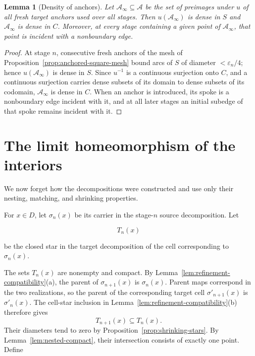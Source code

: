 \documentclass[11pt]{article}
\theoremstyle{mainplain}
\newtheorem{lemma}[theorem]{Lemma}
\theoremstyle{mainroman}
\theoremstyle{definition}
\numberwithin{equation}{section}
\begin{document}
\begin{lemma}[Density of anchors]\label{lem:anchor-density}
Let \(\mathcal A_\infty\subseteq\mathcal A\) be the set of preimages under $u$ of all
fresh target anchors used over all stages. Then \(u(\mathcal A_\infty)\) is
dense in \(S\) and \(\mathcal A_\infty\) is dense in \(C\). Moreover, at every
stage containing a given point of \(\mathcal A_\infty\), that point is incident
with a nonboundary edge.
\end{lemma}
\begin{proof}
At stage \(n\), consecutive fresh anchors of the mesh of
Proposition~\ref{prop:anchored-square-mesh} bound arcs of \(S\) of
diameter \(<\varepsilon_n/4\); hence \(u(\mathcal A_\infty)\) is dense in
\(S\). Since \(u^{-1}\) is a continuous surjection onto \(C\), and a
continuous surjection carries dense subsets of its domain to dense
subsets of its codomain, \(\mathcal A_\infty\) is dense in \(C\).
When an anchor is introduced, its spoke is a nonboundary edge incident
with it, and at all later stages an initial subedge of that spoke
remains incident with it.
\end{proof}

\section{The limit homeomorphism of the interiors}\label{the-limit-homeomorphism-of-the-interiors}

We now forget how the decompositions were constructed and use only their nesting, matching, and shrinking properties.

For \(x\in D\), let \(\sigma_n(x)\) be its carrier in the stage-\(n\) source decomposition. Let

\[
T_n(x)
\]

be the closed star in the target decomposition of the cell corresponding to \(\sigma_n(x)\).

The sets \(T_n(x)\) are nonempty and compact. By
Lemma~\ref{lem:refinement-compatibility}\textup{(a)}, the parent of
$\sigma_{n+1}(x)$ is $\sigma_n(x)$. Parent maps correspond in the two
realizations, so the parent of the corresponding target cell
$\sigma'_{n+1}(x)$ is $\sigma'_n(x)$. The cell-star inclusion in
Lemma~\ref{lem:refinement-compatibility}\textup{(b)} therefore gives
\[
 T_{n+1}(x)\subseteq T_n(x).
\]
Their diameters tend to zero by Proposition~\ref{prop:shrinking-stars}. By
Lemma~\ref{lem:nested-compact}, their intersection consists of exactly
one point. Define
\end{document}
